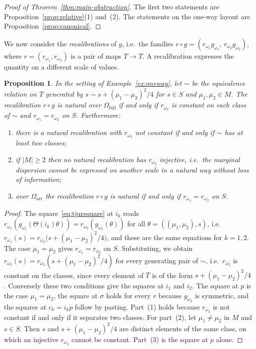 \documentclass[11pt,a4paper]{article}
\theoremstyle{plain}
\newtheorem{proposition}[theorem]{Proposition}
\theoremstyle{definition}
\theoremstyle{remark}
\newcommand{\cat}[1]{\mathsf{#1}}
\newcommand{\catO}{\cat{\Omega}}
\begin{document}
\begin{proof}[Proof of Theorem~\ref{thm:main-obstruction}]
The first two statements are Proposition~\ref{prop:relative}(1) and~(2). The
statements on the one-way layout are Proposition~\ref{prop:canonical}.
\end{proof}

We now consider the \emph{recalibrations} of $g$, i.e.\ the families
$r \circ g = (r_{\omega_1}g_{\omega_1},\, r_{\omega_2}g_{\omega_2})$, where
$r = (r_{\omega_1},r_{\omega_2})$ is a pair of maps $T \to T$. A recalibration
expresses the quantity on a different scale of values.

\begin{proposition}\label{prop:recalib}
In the setting of Example~\ref{ex:oneway}, let $\sim$ be the equivalence
relation on $T$ generated by $s \sim s + (\mu_1-\mu_2)^{2}/4$ for $s \in S$
and $\mu_1,\mu_2 \in M$. The recalibration $r \circ g$ is natural over
$\catO_{\mathrm{full}}$ if and only if $r_{\omega_2}$ is constant on each
class of $\sim$ and $r_{\omega_1} = r_{\omega_2}$ on $S$. Furthermore:
\begin{enumerate}
\item there is a natural recalibration with $r_{\omega_2}$ not constant if and
only if $\sim$ has at least two classes;
\item if $|M| \ge 2$ then no natural recalibration has $r_{\omega_2}$
injective, i.e.\ the marginal dispersion cannot be expressed on another scale
in a natural way without loss of information;
\item over $\catO_{\mathrm{arr}}$ the recalibration $r \circ g$ is natural if
and only if $r_{\omega_1} = r_{\omega_2}$ on $S$.
\end{enumerate}
\end{proposition}

\begin{proof}
The square~\eqref{eq:tjursquare} at $i_k$ reads
$r_{\omega_1}(g_{\omega_1}(\Theta(i_k)\theta)) =
r_{\omega_2}(g_{\omega_2}(\theta))$ for all $\theta = ((\mu_1,\mu_2),s)$, i.e.\
$r_{\omega_1}(s) = r_{\omega_2}\bigl(s + (\mu_1-\mu_2)^{2}/4\bigr)$, and these
are the same equations for $k = 1,2$. The case $\mu_1 = \mu_2$ gives
$r_{\omega_1} = r_{\omega_2}$ on $S$. Substituting, we obtain
$r_{\omega_2}(s) = r_{\omega_2}(s + (\mu_1-\mu_2)^{2}/4)$ for every generating
pair of $\sim$, i.e.\ $r_{\omega_2}$ is constant on the classes, since every
element of $T$ is of the form $s + (\mu_1-\mu_2)^{2}/4$. Conversely these two
conditions give the squares at $i_1$ and $i_2$. The square at $p$ is the case
$\mu_1 = \mu_2$, the square at $\sigma$ holds for every $r$ because
$g_{\omega_2}$ is symmetric, and the squares at $c_k = i_k p$ follow by
pasting. Part~(1) holds because $r_{\omega_2}$ is not constant if and only if
it separates two classes. For part~(2), let $\mu_1 \neq \mu_2$ in $M$ and
$s \in S$. Then $s$ and $s + (\mu_1-\mu_2)^{2}/4$ are distinct elements of the
same class, on which an injective $r_{\omega_2}$ cannot be constant. Part~(3)
is the square at $p$ alone.
\end{proof}
\end{document}
